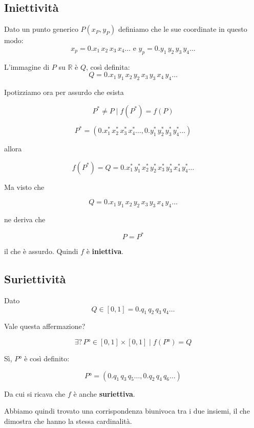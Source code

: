 \documentclass[../../dimostrazioni]{subfiles}
\begin{document}
            \subsection*{Iniettività}

                Dato un punto generico \(P (x_P,y_P) \) definiamo che le sue coordinate in questo modo:
                \[  x_p = 0.x_1 \, x_2 \, x_3 \, x_4 \dots \, \, \text{e} \, \, y_p = 0.y_1 \, y_2 \, y_3 \, y_ 4 \dots \]

                L'immagine di \(P\) su \( \mathbb{R} \) è \( Q \), così definita:
                \[   Q = 0.x_1 \, y_1 \, x_2 \, y_2 \, x_3 \, y_3 \, x_4 \, y_ 4 \dots    \]

                Ipotizziamo ora per assurdo che esista 

                \[    P^* \neq P \mid f(P^*) = f(P) \]

                \[    P^* = (0.x^*_1 \, x^*_2 \, x^*_3 \, x^*_4 \dots , 0.y^*_1 \, y^*_2 \, y^*_3 \, y^*_4 \dots) \]

                allora

                \[    f(P^*) = Q = 0.x^*_1 \, y^*_1 \, x^*_2 \, y^*_2 \, x^*_3 \, y^*_3 \, x^*_4 \, y^*_4 \dots \]

                Ma visto che

                \[ Q = 0.x_1 \, y_1 \, x_2 \, y_2 \, x_3 \, y_3 \, x_4 \, y_ 4 \dots \]

                ne deriva che

                \[P = P^*\]

                il che è assurdo. Quindi \(f\) è \textbf{iniettiva}.

            \subsection*{Suriettività}

                Dato
                \[    Q \in [0,1] = 0.q_1 \, q_2 \, q_3 \, q_4 \dots    \]

                Vale questa affermazione?

                \[    \exists \text{?} \, P° \in [0,1] \times [0,1] \mid f(P°) = Q    \]

                Sì, \(P°\) è così definito:

                \[    P° = (0.q_1 \, q_3 \, q_5 \dots, 0.q_2 \, q_4 \, q_6 \dots)    \]

                Da cui si ricava che \(f\) è anche \textbf{suriettiva}.

                \bigskip

                Abbiamo quindi trovato una corrispondenza biunivoca tra i due insiemi, il che dimostra che hanno la stessa cardinalità.
            
\end{document}
